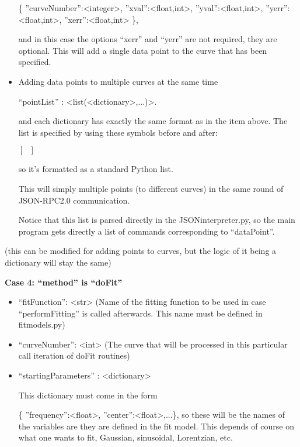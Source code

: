 \documentclass[11pt]{article} %
\begin{document}
\begin{tcolorbox}[breakable,title=Sending ``params'' to the server]
\begin{itemize}
{ \{ {''}curveNumber{''}:<integer>, {''}xval{''}:<float,int>, {''}yval{''}:<float,int>, {''}yerr{''}:<float,int>, {''}xerr{''}:<float,int> \}}, 

and in this case the options ``xerr'' and ``yerr'' are not required, they are optional. This will 
add a single data point to the curve that has been specified.

\item Adding data points to multiple curves at the same time


 ``pointList'' : <list(<dictionary>,...)>. 

and each dictionary has exactly the same format as in the item above. 
The list is specified by using these symbols before and after:

{ $[ ~~~ ]$ }

so it's formatted as a standard Python list.

This will simply multiple points (to different curves) 
in the same round of JSON-RPC2.0 communication. 

Notice that this list is parsed directly in the JSONinterpreter.py, so the main program gets directly a list of commands corresponding to ``dataPoint''. 

\end{itemize}

(this can be modified for adding points to curves, but the logic of it being a dictionary will stay the same)

\textbf{Case 4: ``method'' is ``doFit''}
\begin{itemize}
\item ``fitFunction'': <str> (Name of the fitting function to be used in case ``performFitting'' is called afterwards. This name must be defined in fitmodels.py)

\item ``curveNumber'': <int> (The curve that will be processed in this particular call iteration of doFit routines)

\item ``startingParameters'' : <dictionary>

This dictionary must come in the form 

{ \{ {''}frequency{''}:<float>, {''}center{''}:<float>,...\}}, so these will be the names
of the variables are they are defined in the fit model. This depends of course on what one wants to fit, Gaussian, sinusoidal, Lorentzian, etc.


\end{itemize}
\end{tcolorbox}
\end{document}

